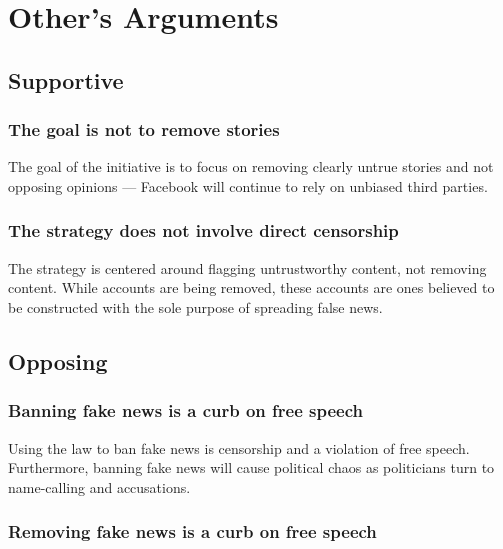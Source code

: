 
\section{Other's Arguments}

\subsection{Supportive}


\subsubsection{The goal is not to remove stories}

The goal of the initiative is to focus on removing clearly untrue stories and not opposing opinions --- Facebook will continue to rely on unbiased third parties. \cite{inc_fb_transparency}

\subsubsection{The strategy does not involve direct censorship}

The strategy is centered around flagging untrustworthy content, not removing content. While accounts are being removed, these accounts are ones believed to be constructed with the sole purpose of spreading false news. \cite{inc_fb_transparency}


\subsection{Opposing}


\subsubsection{Banning fake news is a curb on free speech}

Using the law to ban fake news is censorship and a violation of free speech. Furthermore, banning fake news will cause political chaos as politicians turn to name-calling and accusations. \cite{eff_cali_bill_distrastrous}

\subsubsection{Removing fake news is a curb on free speech}

